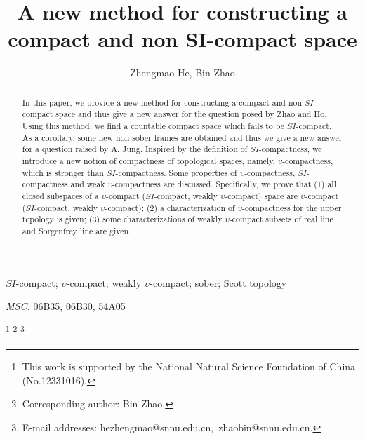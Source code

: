 \documentclass[preprint,12pt]{elsarticle}
\numberwithin{equation}{section}
\begin{document}
\begin{frontmatter}
\title{A new method for constructing a compact and non SI-compact space}
\author{ Zhengmao He, Bin Zhao}



\address{School of Mathematics and Statistics, Shaanxi Normal University,\\ Xi'an 710119, P.R. China}



\begin{abstract}\quad In this paper, we provide a new method for constructing a compact and non $SI$-compact space and thus give a new answer for the question posed by Zhao and Ho. Using this method, we find a countable compact space which fails to be $SI$-compact. As a corollary, some new non sober frames are obtained and thus we give a new answer for a question raised by A. Jung. Inspired by the definition of $SI$-compactness, we introduce a new notion of compactness of topological spaces, namely, $\upsilon$-compactness, which is stronger than $SI$-compactness.  Some properties of $\upsilon$-compactness, $SI$-compactness and weak $\upsilon$-compactness are discussed. Specifically, we prove that (1) all closed subspaces of a $\upsilon$-compact ($SI$-compact, weakly $\upsilon$-compact) space are $\upsilon$-compact ($SI$-compact, weakly $\upsilon$-compact); (2) a characterization of $\upsilon$-compactness for the upper topology is given; (3) some characterizations of weakly $\upsilon$-compact subsets of real line and Sorgenfrey line are given.
\end{abstract}

\begin{keyword}$SI$-compact; $\upsilon$-compact; weakly $\upsilon$-compact; sober; Scott topology
\vspace*{0.6cm}


 {\it{MSC:}} 06B35, 06B30, 54A05

\end{keyword}


\end{frontmatter}
\vspace{0.1cm}

\begingroup
\renewcommand{\thefootnote}{}
\footnote{This work is supported by the National Natural Science Foundation of China (No.12331016).}
\endgroup
\begingroup
\renewcommand{\thefootnote}{}
\footnote{Corresponding author: Bin Zhao.}
\endgroup\begingroup
\renewcommand{\thefootnote}{}
\footnote{E-mail addresses: hezhengmao@snnu.edu.cn,\ zhaobin@snnu.edu.cn.}
\endgroup
\end{document}
